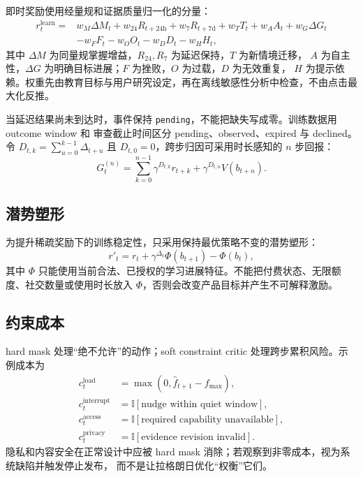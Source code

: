 \documentclass[11pt,a4paper,fontset=none]{ctexart}
\newcommand{\1}{\mathbb{I}}
\begin{document}
即时奖励使用经量规和证据质量归一化的分量：
\begin{align}
  r_t^{\mathrm{learn}}={}&
    w_M\Delta M_t
    +w_{24}R_{t+24\mathrm{h}}
    +w_7R_{t+7\mathrm{d}}
    +w_T T_t
    +w_A A_t
    +w_G\Delta G_t \nonumber\\
    &-w_F F_t-w_O O_t-w_D D_t-w_H H_t,
  \label{eq:reward}
\end{align}
其中 $\Delta M$ 为同量规掌握增益，$R_{24},R_7$ 为延迟保持，$T$ 为新情境迁移，
$A$ 为自主性，$\Delta G$ 为明确目标进展；$F$ 为挫败，$O$ 为过载，$D$ 为无效重复，
$H$ 为提示依赖。权重先由教育目标与用户研究设定，再在离线敏感性分析中检查，不由点击最大化反推。

当延迟结果尚未到达时，事件保持 \texttt{pending}，不能把缺失写成零。训练数据用 outcome window 和
审查截止时间区分 pending、observed、expired 与 declined。令
$D_{t,k}=\sum_{u=0}^{k-1}\Delta_{t+u}$ 且 $D_{t,0}=0$，跨步归因可采用时长感知的 $n$ 步回报：
\begin{equation}
  G_t^{(n)}=\sum_{k=0}^{n-1}\gamma^{D_{t,k}} r_{t+k}
  +\gamma^{D_{t,n}} V(b_{t+n}).
  \label{eq:nstep}
\end{equation}

\subsection{潜势塑形}

为提升稀疏奖励下的训练稳定性，只采用保持最优策略不变的潜势塑形：
\begin{equation}
  r'_t=r_t+\gamma^{\Delta_t}\Phi(b_{t+1})-\Phi(b_t),
  \label{eq:potential-shaping}
\end{equation}
其中 $\Phi$ 只能使用当前合法、已授权的学习进展特征。不能把付费状态、无限额度、社交数量或使用时长放入
$\Phi$，否则会改变产品目标并产生不可解释激励。

\subsection{约束成本}

hard mask 处理“绝不允许”的动作；soft constraint critic 处理跨步累积风险。示例成本为
\begin{align}
  c_t^{\mathrm{load}} &= \max(0,\widehat f_{t+1}-f_{\max}),\\
  c_t^{\mathrm{interrupt}} &= \1[\text{nudge within quiet window}],\\
  c_t^{\mathrm{access}} &= \1[\text{required capability unavailable}],\\
  c_t^{\mathrm{privacy}} &= \1[\text{evidence revision invalid}].
\end{align}
隐私和内容安全在正常设计中应被 hard mask 消除；若观察到非零成本，视为系统缺陷并触发停止发布，
而不是让拉格朗日优化“权衡”它们。
\end{document}
